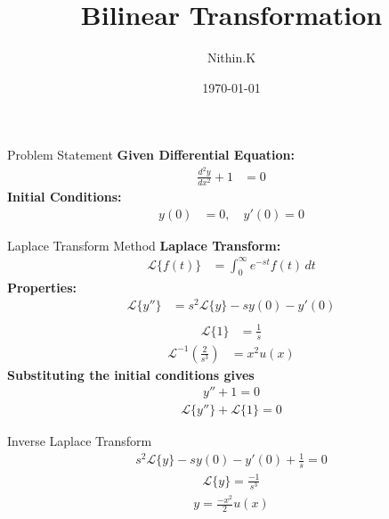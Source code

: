 \documentclass{beamer}
\title{Bilinear Transformation}
\author{Nithin.K}
\date{\today}
\begin{document}
\begin{frame}
	\titlepage
\end{frame}

\begin{frame}{Problem Statement}
	\textbf{Given Differential Equation:}
	\begin{align}
		\frac{d^2y}{dx^2} + 1 &= 0
	\end{align}
	\textbf{Initial Conditions:}
	\begin{align}
		y(0) &= 0, \quad y'(0) = 0
	\end{align}
\end{frame}

\begin{frame}{Laplace Transform Method}
	\textbf{Laplace Transform:}
	\begin{align}
		\mathcal{L}\{f(t)\} &= \int_{0}^{\infty} e^{-st} f(t) \, dt
	\end{align}
	\textbf{Properties:}
	\begin{align}
		\mathcal{L}\{y''\} &= s^2 \mathcal{L}\{y\} - s y(0) - y'(0) \\
	\end{align}
	\begin{align}
		\mathcal{L}\{1\} &= \frac{1}{s}
	\end{align}
	\begin{align}
		\mathcal{L}^{-1}\left(\frac{2}{s^3}\right) &= x^2 u(x)
	\end{align}
	\textbf{Substituting the initial conditions gives}
	\begin{align}
		y'' + 1 = 0
	\end{align}
	\begin{align}
		\mathcal{L}\{y''\} + \mathcal{L}\{1\} = 0
	\end{align}
\end{frame}

\begin{frame}{Inverse Laplace Transform}
        \begin{align}
	        s^2 \mathcal{L}\{y\} - sy\left(0\right) - y'\left(0\right) + \frac{1}{s} = 0
	\end{align}
	\begin{align}
	        \mathcal{L}\{y\} = \frac{-1}{s^3}
	\end{align}
	\begin{align}
	         y = \frac{-x^2}{2}u\left(x\right)
	\end{align}
\end{frame}
\end{document}
